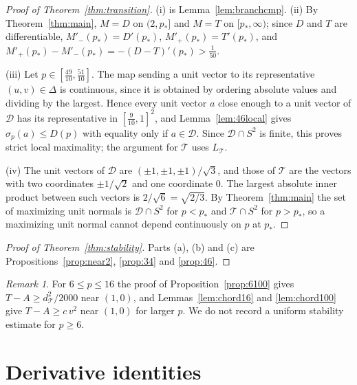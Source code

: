 \documentclass[11pt]{amsart}
\theoremstyle{definition}
\theoremstyle{remark}
\newtheorem{remark}[theorem]{Remark}
\numberwithin{equation}{section}
\newcommand{\cD}{\mathcal{D}}
\newcommand{\cT}{\mathcal{T}}
\begin{document}
\begin{proof}[Proof of Theorem~\ref{thm:transition}]
(i) is Lemma~\ref{lem:branchcmp}. (ii) By Theorem~\ref{thm:main}, $M=D$ on $(2,p_*]$ and $M=T$ on $[p_*,\infty)$; since $D$ and $T$ are differentiable, $M'_-(p_*)=D'(p_*)$, $M'_+(p_*)=T'(p_*)$, and $M'_+(p_*)-M'_-(p_*)=-(D-T)'(p_*)>\frac1{50}$.

(iii) Let $p\in[\frac{49}{10},\frac{51}{10}]$. The map sending a unit vector to its representative $(u,v)\in\Delta$ is continuous, since it is obtained by ordering absolute values and dividing by the largest. Hence every unit vector $a$ close enough to a unit vector of $\cD$ has its representative in $[\frac9{10},1]^2$, and Lemma~\ref{lem:46local} gives $\sigma_p(a)\le D(p)$ with equality only if $a\in\cD$. Since $\cD\cap S^2$ is finite, this proves strict local maximality; the argument for $\cT$ uses $L_\cT$.

(iv) The unit vectors of $\cD$ are $(\pm1,\pm1,\pm1)/\sqrt3$, and those of $\cT$ are the vectors with two coordinates $\pm1/\sqrt2$ and one coordinate $0$. The largest absolute inner product between such vectors is $2/\sqrt6=\sqrt{2/3}$. By Theorem~\ref{thm:main} the set of maximizing unit normals is $\cD\cap S^2$ for $p<p_*$ and $\cT\cap S^2$ for $p>p_*$, so a maximizing unit normal cannot depend continuously on $p$ at $p_*$.
\end{proof}

\begin{proof}[Proof of Theorem~\ref{thm:stability}]
Parts (a), (b) and (c) are Propositions~\ref{prop:near2}, \ref{prop:34} and \ref{prop:46}.
\end{proof}

\begin{remark}
For $6\le p\le16$ the proof of Proposition~\ref{prop:6100} gives $T-A\ge d_\cT^2/2000$ near $(1,0)$, and Lemmas~\ref{lem:chord16} and \ref{lem:chord100} give $T-A\ge c\,v^2$ near $(1,0)$ for larger $p$. We do not record a uniform stability estimate for $p\ge6$.
\end{remark}

\appendix

\section{Derivative identities}\label{app:identities}
\end{document}
